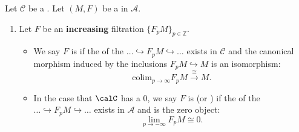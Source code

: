 \begin{definition} \label{definition:exhaustive_separated_filtrations_on_an_abelian_category}
    Let $\mathcal{C}$ be a . Let $(M, F)$ be a  in $\mathcal{A}$.
    
    \begin{enumerate}
        \item Let $F$ be an \textbf{increasing} filtration $\{F_p M\}_{p \in \mathbb{Z}}$.
        \begin{itemize}
            \item We say $F$ is  if the  of the  $\dots \hookrightarrow F_p M \hookrightarrow \dots$ exists in $\mathcal{C}$ and the canonical morphism induced by the inclusions $F_p M \hookrightarrow M$ is an isomorphism:
            $$\text{colim}_{p \to \infty} F_p M \xrightarrow{\cong} M.$$
            \item In the case that $\calC$ has a  $0$, we say $F$ is  (or ) if the  of the  $\dots \hookrightarrow F_p M \hookrightarrow \dots$ exists in $\mathcal{A}$ and is the zero object:
            $$\lim_{p \to -\infty} F_p M \cong 0.$$
        \end{itemize}


\end{enumerate}
\end{definition}
